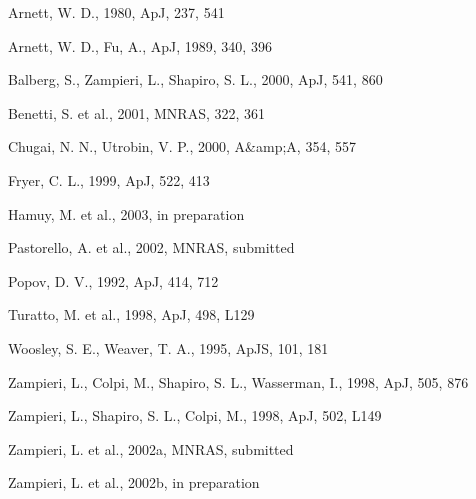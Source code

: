 {{{{{{{{{{{{{{\begin{references}
Arnett, W. D., 1980, ApJ, 237, 541

Arnett, W. D., Fu, A., ApJ, 1989, 340, 396

Balberg, S., Zampieri, L., Shapiro, S. L., 2000, ApJ, 541, 860

Benetti, S. et al., 2001, MNRAS, 322, 361

Chugai, N. N., Utrobin, V. P., 2000, A&amp;A, 354, 557

Fryer, C. L., 1999, ApJ, 522, 413

Hamuy, M. et al., 2003, in preparation

Pastorello, A. et al., 2002, MNRAS, submitted

Popov, D. V., 1992, ApJ, 414, 712

Turatto, M. et al., 1998, ApJ, 498, L129

Woosley, S. E., Weaver, T. A., 1995, ApJS, 101, 181

Zampieri, L., Colpi, M., Shapiro, S. L., Wasserman, I., 1998, ApJ, 505, 876

Zampieri, L., Shapiro, S. L., Colpi, M., 1998, ApJ, 502, L149

Zampieri, L. et al., 2002a, MNRAS, submitted

Zampieri, L. et al., 2002b, in preparation



\end{references}}}}}}}}}}}}}}}
